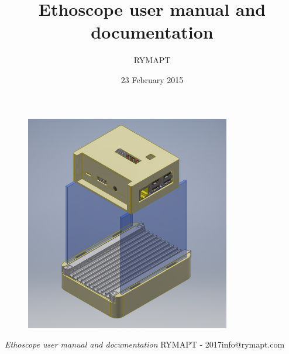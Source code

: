 \documentclass[10pt,twoside, fleqn]{memoir}
\author{RYMAPT}
\title{Ethoscope user manual and documentation}
\date{23 February 2015}
\makeatletter
\def\maketitle{%
  \null
  \thispagestyle{empty}%
  \vfill
  \begin{center}\leavevmode
    \normalfont
    {\LARGE\raggedleft \@author\par}%
    \hrulefill\par
    {\huge\raggedright \@title\par}%
    \vskip 1cm
  \end{center}%
  \vfill
  \null
  \cleardoublepage
  }
\makeatother
\begin{document}
\let\cleardoublepage\clearpage


\maketitle
\frontmatter

\null\vfill
\begin{center}
\begin{figure}
  \centering
  \includegraphics[width=0.80\textwidth]{./images/isometric.jpg}
  \label{fig:Intro}
\end{figure}
\end{center}
\begin{flushleft}
\textit{Ethoscope user manual and documentation}\newline
\newline
RYMAPT - 2017\newline info@rymapt.com
\bigskip

\end{flushleft}
\let\cleardoublepage\clearpage

\newpage
\tableofcontents

\mainmatter
\sloppy




%

%
%
%
%

%


\printglossary[type=\acronymtype,title=Abbreviations]

%
%
\end{document}
